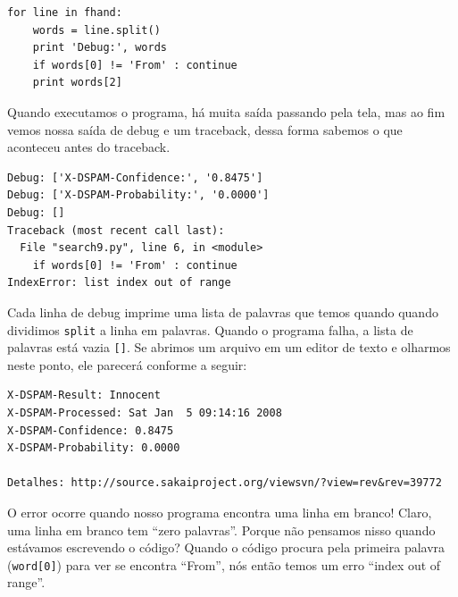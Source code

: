 \begin{enumerate}

\beforeverb
\begin{verbatim}
for line in fhand:
    words = line.split()
    print 'Debug:', words
    if words[0] != 'From' : continue
    print words[2]
\end{verbatim}
\afterverb
%
Quando executamos o programa, há muita saída passando pela tela,
mas ao fim vemos nossa saída de debug e um traceback, dessa forma
sabemos o que aconteceu antes do traceback.


\beforeverb
\begin{verbatim}
Debug: ['X-DSPAM-Confidence:', '0.8475']
Debug: ['X-DSPAM-Probability:', '0.0000']
Debug: []
Traceback (most recent call last):
  File "search9.py", line 6, in <module>
    if words[0] != 'From' : continue
IndexError: list index out of range
\end{verbatim}
\afterverb
%
Cada linha de debug imprime uma lista de palavras que temos quando
quando dividimos {\tt split}  a linha em palavras. Quando o programa
falha, a lista de palavras está vazia \verb"[]". Se abrimos um arquivo
em um editor de texto e olharmos neste ponto, ele parecerá conforme a seguir:


\beforeverb
\begin{verbatim}
X-DSPAM-Result: Innocent
X-DSPAM-Processed: Sat Jan  5 09:14:16 2008
X-DSPAM-Confidence: 0.8475
X-DSPAM-Probability: 0.0000

Detalhes: http://source.sakaiproject.org/viewsvn/?view=rev&rev=39772
\end{verbatim}
\afterverb
%
O error ocorre quando nosso programa encontra uma linha em branco! Claro, uma linha em
branco tem ``zero palavras''. Porque não pensamos nisso quando estávamos escrevendo o código?
Quando o código procura pela primeira palavra (\verb"word[0]") para ver se encontra ``From'',
nós então temos um erro ``index out of range''.



\end{enumerate}
